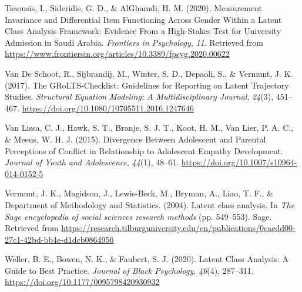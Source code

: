 \documentclass[
  ,man,floatsintext]{apa6}
\newlength{\cslhangindent}
\newlength{\cslentryspacingunit} %
\newenvironment{CSLReferences}[2] %
 {%
  \setlength{\parindent}{0pt}
  \ifodd #1
  \let\oldpar\par
  \def\par{\hangindent=\cslhangindent\oldpar}
  \fi
  \setlength{\parskip}{#2\cslentryspacingunit}
 }%
 {}
\begin{document}
\begin{CSLReferences}{1}{0}
\leavevmode{}%
Tsaousis, I., Sideridis, G. D., \& AlGhamdi, H. M. (2020). Measurement {Invariance} and {Differential} {Item} {Functioning} {Across} {Gender} {Within} a {Latent} {Class} {Analysis} {Framework}: {Evidence} {From} a {High}-{Stakes} {Test} for {University} {Admission} in {Saudi} {Arabia}. \emph{Frontiers in Psychology}, \emph{11}. Retrieved from \url{https://www.frontiersin.org/articles/10.3389/fpsyg.2020.00622}

\leavevmode{}%
Van De Schoot, R., Sijbrandij, M., Winter, S. D., Depaoli, S., \& Vermunt, J. K. (2017). The {GRoLTS}-{Checklist}: {Guidelines} for {Reporting} on {Latent} {Trajectory} {Studies}. \emph{Structural Equation Modeling: A Multidisciplinary Journal}, \emph{24}(3), 451--467. \url{https://doi.org/10.1080/10705511.2016.1247646}

\leavevmode{}%
Van Lissa, C. J., Hawk, S. T., Branje, S. J. T., Koot, H. M., Van Lier, P. A. C., \& Meeus, W. H. J. (2015). Divergence {Between} {Adolescent} and {Parental} {Perceptions} of {Conflict} in {Relationship} to {Adolescent} {Empathy} {Development}. \emph{Journal of Youth and Adolescence}, \emph{44}(1), 48--61. \url{https://doi.org/10.1007/s10964-014-0152-5}

\leavevmode{}%
Vermunt, J. K., Magidson, J., Lewis-Beck, M., Bryman, A., Liao, T. F., \& Department of Methodology and Statistics. (2004). Latent class analysis. In \emph{The {Sage} encyclopedia of social sciences research methods} (pp. 549--553). Sage. Retrieved from \url{https://research.tilburguniversity.edu/en/publications/0caedd00-27c1-42bd-bb4e-d1dcb0864956}

\leavevmode{}%
Weller, B. E., Bowen, N. K., \& Faubert, S. J. (2020). Latent {Class} {Analysis}: {A} {Guide} to {Best} {Practice}. \emph{Journal of Black Psychology}, \emph{46}(4), 287--311. \url{https://doi.org/10.1177/0095798420930932}

\end{CSLReferences}
\end{document}
